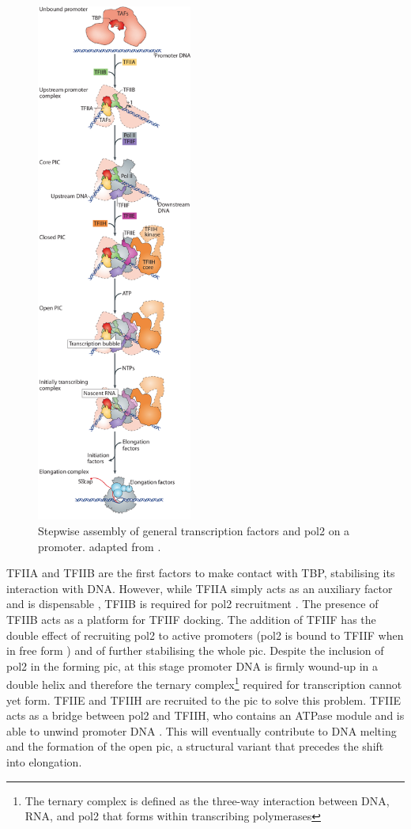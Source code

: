 \begin{figure}
\centering
\includegraphics[width=5.094cm]{figures/introduction/picAssembly} %
\caption[Stepwise PIC assembly]{
Stepwise assembly of general transcription factors and \gls{pol2} on a promoter.
adapted from \cite{sainsbury:2015:structural}.
}
\label{fig:picAssembly}
\centering
\end{figure}

TFIIA and TFIIB are the first factors to make contact with TBP, stabilising its interaction with DNA.
However, while TFIIA simply acts as an auxiliary factor and is dispensable \citep{imbalzano:1994:transcription}, TFIIB is required for \gls{pol2} recruitment \citep{bushnell:2004:structural}.
The presence of TFIIB  acts as a platform for TFIIF docking. 
The addition of TFIIF has the double effect of recruiting \gls{pol2} to active promoters (\gls{pol2} is bound to TFIIF when in free form \citep{rani:2004:rna}) and of further stabilising the whole \gls{pic}. 
Despite the inclusion of \gls{pol2} in the forming \gls{pic}, at this stage promoter DNA is firmly wound-up in a double helix and therefore the ternary complex\footnote{The ternary complex is defined as the three-way interaction between DNA, RNA, and \gls{pol2} that forms within transcribing polymerases} required for transcription cannot yet form.
TFIIE and TFIIH are recruited to the \gls{pic} to solve this problem.
TFIIE acts as a bridge between \gls{pol2} and TFIIH, who contains an ATPase module and is able to unwind promoter DNA \citep{holstege:1996:opening}.
This will eventually contribute to DNA melting and the formation of the open \gls{pic}, a structural variant that precedes the shift into elongation.


